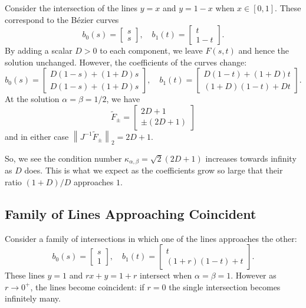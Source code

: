 \documentclass[3p, authoryear, square]{elsarticle}
\theoremstyle{definition}
\begin{document}
Consider the intersection of the lines \(y = x\) and \(y = 1 - x\) when
\(x \in \left[0, 1\right]\). These correspond to the B\'{e}zier curves
\begin{equation}
b_0(s) = \left[ \begin{array}{c} s \\ s \end{array}\right], \quad
b_1(t) = \left[ \begin{array}{c} t \\ 1 - t \end{array}\right].
\end{equation}
By adding a scalar \(D > 0\) to each component, we leave \(F(s, t)\) and hence
the solution unchanged. However, the coefficients of the curves change:
\begin{equation}
b_0(s) = \left[ \begin{array}{c} D(1 - s) + (1 + D)s \\ D(1 - s) + (1 + D)s
  \end{array}\right], \quad b_1(t) = \left[ \begin{array}{c}
  D(1 - t) + (1 + D)t \\ (1 + D)(1 - t) + Dt \end{array}\right].
\end{equation}
At the solution \(\alpha = \beta = 1/2\), we have
\begin{equation}
\widetilde{F}_{\pm} = \left[ \begin{array}{c} 2D + 1 \\ \pm(2D + 1)
  \end{array}\right]
\end{equation}
and in either case \(\left \lVert J^{-1} \widetilde{F}_{\pm} \right \rVert_2 =
2D + 1\).

So, we see the condition number \(\kappa_{\alpha, \beta} = \sqrt{2}(2D + 1)\)
increases towards infinity as \(D\) does. This is what we expect as the
coefficients grow so large that their ratio \((1 + D) / D\) approaches \(1\).

\subsection{Family of Lines Approaching Coincident}

Consider a family of intersections in which one of the lines approaches the
other:
\begin{equation}
b_0(s) = \left[ \begin{array}{c} s \\ 1 \end{array}\right], \quad
b_1(t) = \left[ \begin{array}{c} t \\ (1 + r)(1 - t) + t \end{array}\right].
\end{equation}
These lines \(y = 1\) and \(rx + y = 1 + r\) intersect when
\(\alpha = \beta = 1\). However as \(r \longrightarrow 0^+\), the lines
become coincident: if \(r = 0\) the single intersection becomes infinitely
many.
\end{document}
